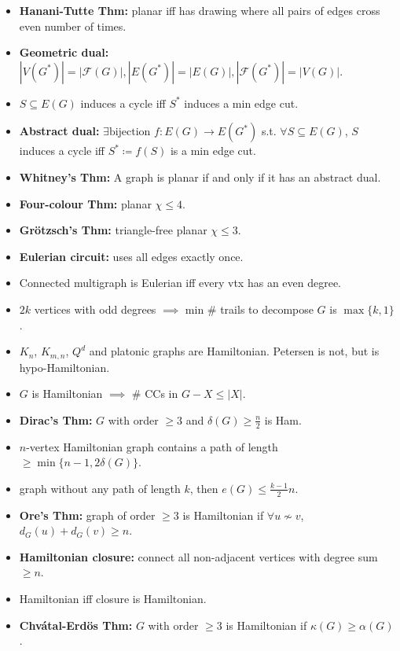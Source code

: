\documentclass[10pt]{article}
\newcommand{\abs}[1]{\left\lvert#1\right\rvert}
\begin{document}
\begin{multicols*}{3}
\begin{itemize}
            \item \textbf{Hanani-Tutte Thm:} planar iff has drawing where all pairs of edges cross even number of times.
            \item \textbf{Geometric dual:} $\abs{V(G^*)} = \abs{\mathcal{F}(G)}, \abs{E(G^*)} = \abs{E(G)}, \abs{\mathcal{F}(G^*)} = \abs{V(G)}$.
            \item $S \subseteq E(G)$ induces a cycle iff $S^*$ induces a min edge cut.
            \item \textbf{Abstract dual:} $\exists \textrm{bijection } f \colon E(G) \to E(G^*)$ s.t. $\forall S \subseteq E(G)$, $S$ induces a cycle iff $S^* \coloneqq f(S)$ is a min edge cut.
            \item \textbf{Whitney's Thm:} A graph is planar if and only if it has an abstract dual.
            \item \textbf{Four-colour Thm:} planar $\chi \leq 4$.
            \item \textbf{Gr\"{o}tzsch's Thm:} triangle-free planar $\chi \leq 3$.
            \item \textbf{Eulerian circuit:} uses all edges exactly once.
            \item Connected multigraph is Eulerian iff every vtx has an even degree.
            \item $2k$ vertices with odd degrees $\implies$ min \# trails to decompose $G$ is $\max\{k, 1\}$.
            \item $K_n$, $K_{m, n}$, $Q^d$ and platonic graphs are Hamiltonian. Petersen is not, but is hypo-Hamiltonian.
            \item $G$ is Hamiltonian $\implies$ \# CCs in $G - X \leq \abs{X}$.
            \item \textbf{Dirac's Thm:} $G$ with order $\geq 3$ and $\delta(G) \geq \frac{n}{2}$ is Ham.
            \item $n$-vertex Hamiltonian graph contains a path of length $\geq \min\{n - 1, 2\delta(G)\}$.
            \item graph without any path of length $k$, then $e(G) \leq \frac{k - 1}{2}n$.
            \item \textbf{Ore's Thm:} graph of order $\geq 3$ is Hamiltonian if $\forall u \not\sim v$, $d_G(u) + d_G(v) \geq n$.
            \item \textbf{Hamiltonian closure:} connect all non-adjacent vertices with degree sum $\geq n$.
            \item Hamiltonian iff closure is Hamiltonian.
            \item \textbf{Chv\'{a}tal-Erd\"{o}s Thm:} $G$ with order $\geq 3$ is Hamiltonian if $\kappa(G) \geq \alpha(G)$.

\end{itemize}
\end{multicols*}
\end{document}
